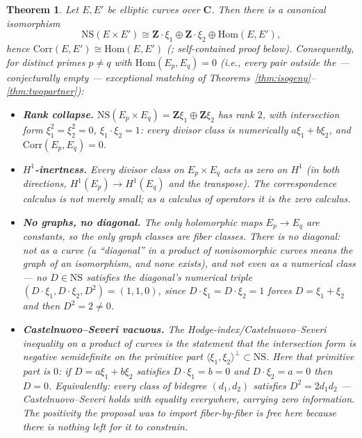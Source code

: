 \documentclass[11pt]{article}
\newtheorem{theorem}{Theorem}
\theoremstyle{definition}
\theoremstyle{remark}
\newcommand{\Z}{\mathbf{Z}}
\newcommand{\C}{\mathbf{C}}
\newcommand{\NS}{\mathrm{NS}}
\newcommand{\Hom}{\mathrm{Hom}}
\newcommand{\Corr}{\mathrm{Corr}}
\begin{document}
\begin{theorem}
\label{thm:NS}
Let $E, E'$ be elliptic curves over $\C$. Then there is a canonical
isomorphism
\[
\NS(E \times E') \cong \Z\cdot\xi_1 \oplus \Z\cdot\xi_2 \oplus \Hom(E, E') ,
\]
hence $\Corr(E, E') \cong \Hom(E, E')$ (\cite[Ch.~5]{BL}; self-contained
proof below). Consequently, for distinct primes $p \neq q$ with
$\Hom(E_p, E_q) = 0$ (i.e., every pair outside the --- conjecturally
empty --- exceptional matching of
Theorems~\ref{thm:isogeny}--\ref{thm:twopartner}):
\begin{itemize}
\item[\textup{(a)}] \textbf{Rank collapse.}
$\NS(E_p \times E_q) = \Z\xi_1 \oplus \Z\xi_2$ has rank $2$, with
intersection form $\xi_1^2 = \xi_2^2 = 0$, $\xi_1\cdot\xi_2 = 1$: every
divisor class is numerically $a\xi_1 + b\xi_2$, and $\Corr(E_p, E_q) = 0$.
\item[\textup{(b)}] \textbf{$H^1$-inertness.} Every divisor class on
$E_p \times E_q$ acts as zero on $H^1$ (in both directions,
$H^1(E_p) \to H^1(E_q)$ and the transpose). The correspondence calculus is
not merely small; as a calculus of operators it is the zero calculus.
\item[\textup{(c)}] \textbf{No graphs, no diagonal.} The only holomorphic
maps $E_p \to E_q$ are constants, so the only graph classes are fiber
classes. There is no diagonal: not as a curve (a ``diagonal'' in a product
of nonisomorphic curves means the graph of an isomorphism, and none exists),
and not even as a numerical class --- no $D \in \NS$ satisfies the
diagonal's numerical triple $(D\cdot\xi_1, D\cdot\xi_2, D^2) = (1, 1, 0)$,
since $D\cdot\xi_1 = D\cdot\xi_2 = 1$ forces $D = \xi_1 + \xi_2$ and then
$D^2 = 2 \neq 0$.
\item[\textup{(d)}] \textbf{Castelnuovo--Severi vacuous.} The
Hodge-index/Castelnuovo--Severi inequality on a product of curves is the
statement that the intersection form is negative semidefinite on the
\emph{primitive} part $\langle \xi_1, \xi_2 \rangle^\perp \subset \NS$. Here
that primitive part is $0$: if $D = a\xi_1 + b\xi_2$ satisfies
$D\cdot\xi_1 = b = 0$ and $D\cdot\xi_2 = a = 0$ then $D = 0$. Equivalently:
every class of bidegree $(d_1, d_2)$ satisfies $D^2 = 2 d_1 d_2$ ---
Castelnuovo--Severi holds \emph{with equality everywhere}, carrying zero
information. The positivity the proposal was to import fiber-by-fiber is free
here because there is nothing left for it to constrain.
\end{itemize}
\end{theorem}
\end{document}
